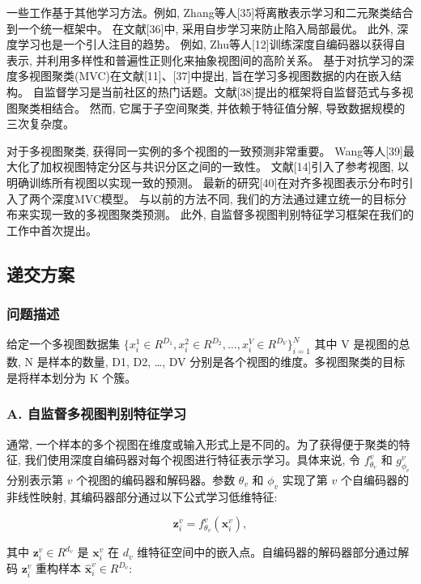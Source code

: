 \documentclass{article}
\begin{document}
一些工作基于其他学习方法。例如, Zhang等人[35]将离散表示学习和二元聚类结合到一个统一框架中。
在文献[36]中, 采用自步学习来防止陷入局部最优。
此外, 深度学习也是一个引人注目的趋势。
例如, Zhu等人[12]训练深度自编码器以获得自表示, 并利用多样性和普遍性正则化来抽象视图间的高阶关系。
基于对抗学习的深度多视图聚类(MVC)在文献[11]、[37]中提出, 旨在学习多视图数据的内在嵌入结构。
自监督学习是当前社区的热门话题。文献[38]提出的框架将自监督范式与多视图聚类相结合。
然而, 它属于子空间聚类, 并依赖于特征值分解, 导致数据规模的三次复杂度。

对于多视图聚类, 获得同一实例的多个视图的一致预测非常重要。
Wang等人[39]最大化了加权视图特定分区与共识分区之间的一致性。
文献[14]引入了参考视图, 以明确训练所有视图以实现一致的预测。
最新的研究[40]在对齐多视图表示分布时引入了两个深度MVC模型。
与以前的方法不同, 我们的方法通过建立统一的目标分布来实现一致的多视图聚类预测。
此外, 自监督多视图判别特征学习框架在我们的工作中首次提出。

\subsection{递交方案}

\subsubsection*{问题描述}

给定一个多视图数据集
\(
\{
x_i^1 \in R^{D_1},
x_i^2 \in R^{D_2},
\ldots,
x_i^V \in R^{D_V}
\}_{i=1}^{N}
\)
其中 V 是视图的总数, N 是样本的数量, D1, D2, \ldots, DV 分别是各个视图的维度。多视图聚类的目标是将样本划分为 K 个簇。

\subsubsection*{A. 自监督多视图判别特征学习}



通常, 一个样本的多个视图在维度或输入形式上是不同的。为了获得便于聚类的特征, 我们使用深度自编码器对每个视图进行特征表示学习。具体来说, 令 $f^v_{\theta_v}$ 和 $g^v_{\phi_v}$ 分别表示第 $v$ 个视图的编码器和解码器。参数 $\theta_v$ 和 $\phi_v$ 实现了第 $v$ 个自编码器的非线性映射, 其编码器部分通过以下公式学习低维特征:

\begin{equation}
    \mathbf{z}^v_i = f^v_{\theta_v}(\mathbf{x}^v_i),
\end{equation}

其中 $\mathbf{z}^v_i \in R^{d_v}$ 是 $\mathbf{x}^v_i$ 在 $d_v$ 维特征空间中的嵌入点。自编码器的解码器部分通过解码 $\mathbf{z}^v_i$ 重构样本 $\hat{\mathbf{x}}^v_i \in R^{D_v}$:
\end{document}
